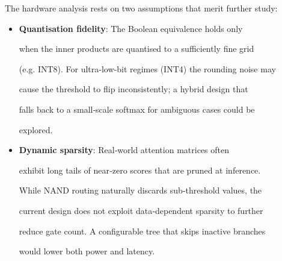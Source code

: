 \label{subsec:limitations}













The hardware analysis rests on two assumptions that merit further study:













\begin{itemize}






  \item \textbf{Quantisation fidelity}: The Boolean equivalence holds only






    when the inner products are quantised to a sufficiently fine grid






    (e.g. INT8).  For ultra‑low‑bit regimes (INT4) the rounding noise may






    cause the threshold to flip inconsistently; a hybrid design that






    falls back to a small‑scale softmax for ambiguous cases could be






    explored.






  \item \textbf{Dynamic sparsity}: Real‑world attention matrices often






    exhibit long tails of near‑zero scores that are pruned at inference.






    While NAND routing naturally discards sub‑threshold values, the






    current design does not exploit data‑dependent sparsity to further






    reduce gate count.  A configurable tree that skips inactive branches






    would lower both power and latency.






\end{itemize}
